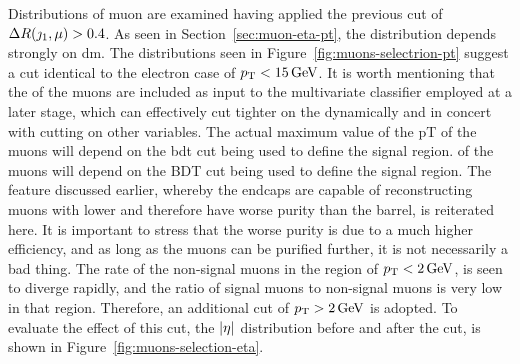 Distributions of muon \pt are examined having applied the previous cut of $\Delta R(\jmath_1,\mu)>0.4$. As seen in Section~\ref{sec:muon-eta-pt}, the \pt distribution depends strongly on \gls{dm}. The \pt distributions seen in Figure~\ref{fig:muons-selectrion-pt} suggest a cut identical to the electron case of $p_{\mathrm{T}}<15\,\text{Ge\hspace{-.08em}V}$. It is worth mentioning that the \pt of the muons are included as input to the multivariate classifier employed at a later stage, which can effectively cut tighter on the \pt dynamically and in concert with cutting on other variables. The actual maximum value of the pT of the muons will depend on the \gls{bdt} cut being used to define the signal region. \pt of the muons will depend on the BDT cut being used to define the signal region. The feature discussed earlier, whereby the endcaps are capable of reconstructing muons with lower \pt and therefore have worse purity than the barrel, is reiterated here. It is important to stress that the worse purity is due to a much higher efficiency, and as long as the muons can be purified further, it is not necessarily a bad thing. The rate of  the non-signal muons in the region of $p_{\mathrm{T}}<2\,\text{Ge\hspace{-.08em}V}$, is seen to diverge rapidly, and the ratio of signal muons to non-signal muons is very low in that region. Therefore, an additional cut of $p_{\mathrm{T}}>2\,\text{Ge\hspace{-.08em}V}$ is adopted. To evaluate the effect of this cut, the $\abs{\eta}$ distribution before and after the \pt cut, is shown in Figure~\ref{fig:muons-selection-eta}.

